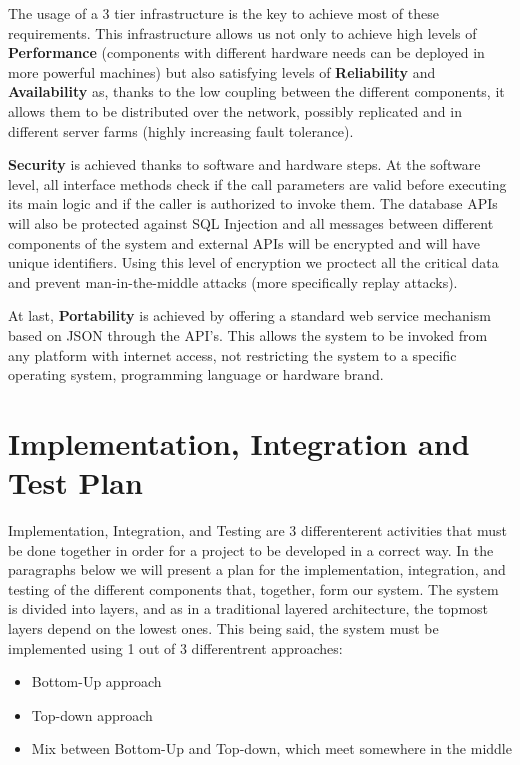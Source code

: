 \documentclass[12pt]{article}
\begin{document}
\noindent The usage of a 3 tier infrastructure is the key to achieve most of these requirements. This infrastructure allows us not only to achieve high levels of \textbf{Performance} (components with different hardware needs can be deployed in more powerful machines) but also satisfying levels of \textbf{Reliability} and \textbf{Availability} as, thanks to the low coupling between the different components, it allows them to be distributed over the network, possibly replicated and in different server farms (highly increasing fault tolerance).

\noindent \textbf{Security} is achieved thanks to software and hardware steps. At the software level, all interface methods check if the call parameters are valid before executing its main logic and if the caller is authorized to invoke them. The database APIs will also be protected against SQL Injection and all messages between different components of the system and external APIs will be encrypted and will have unique identifiers. Using this level of encryption we proctect all the critical data and prevent man-in-the-middle attacks (more specifically replay attacks).

\noindent At last, \textbf{Portability} is achieved by offering a standard web service mechanism based on JSON through the API's. This allows the system to be invoked from any platform with internet access, not restricting the system to a specific operating system, programming language or hardware brand.

\section{Implementation, Integration and Test Plan}
Implementation, Integration, and Testing are 3 differenterent activities that must be done
together in order for a project to be developed in a correct way. In the paragraphs below we will present a
plan for the implementation, integration, and testing of the different components that, together, form our 
system.
The system is divided into layers, and as in a traditional layered architecture,
the topmost layers depend on the lowest ones. This being said, the system must be
implemented using 1 out of 3 differentrent approaches:
\begin{itemize}
    \item Bottom-Up approach
    \item Top-down approach
    \item Mix between Bottom-Up and Top-down, which meet somewhere in the middle 
     
\end{itemize}
\end{document}

